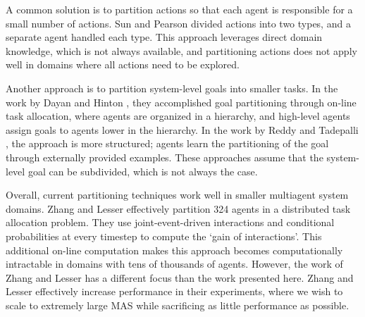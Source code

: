 \documentclass[letterpaper]{article}
\begin{document}
A common solution is to partition actions so that each agent is responsible for a small number of actions. Sun and Pearson  divided actions into two types, and a separate agent handled each type. This approach leverages direct domain knowledge, which is not always available, and partitioning actions does not apply well in domains where all actions need to be explored.

Another approach is to partition system-level goals into smaller tasks. In the work by Dayan and Hinton , they accomplished goal partitioning through on-line task allocation, where agents are organized in a hierarchy, and high-level agents assign goals to agents lower in the hierarchy. In the work by Reddy and Tadepalli , the approach is more structured; agents learn the partitioning of the goal through externally provided examples. These approaches assume that the system-level goal can be subdivided, which is not always the case. 

Overall, current partitioning techniques work well in smaller multiagent system domains. Zhang and Lesser  effectively partition 324 agents in a distributed task allocation problem. They use joint-event-driven interactions and conditional probabilities at every timestep to compute the `gain of interactions'. This additional on-line computation makes this approach becomes computationally intractable in domains with tens of thousands of agents. However, the work of Zhang and Lesser has a different focus than the work presented here. Zhang and Lesser effectively increase performance in their experiments, where we wish to scale to extremely large MAS while sacrificing as little performance as possible.

\end{document}
